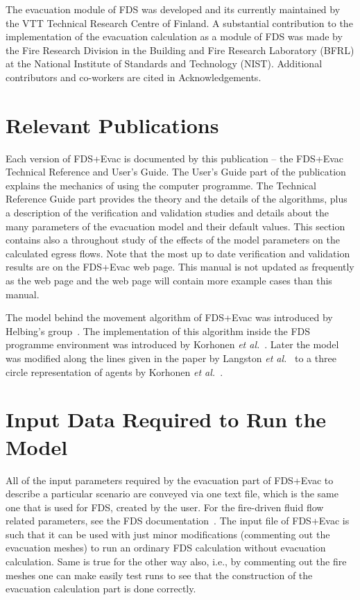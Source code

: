 \documentclass[12pt,a4paper,final,twoside]{stylevk}
\begin{document}
\noindent The evacuation module of FDS was developed and its currently
maintained by the VTT Technical Research Centre of Finland.  A
substantial contribution to the implementation of the evacuation
calculation as a module of FDS was made by the Fire Research Division
in the Building and Fire Research Laboratory (BFRL) at the National
Institute of Standards and Technology (NIST).  Additional contributors
and co-workers are cited in Acknowledgements.


\section{Relevant Publications}

\noindent Each version of FDS+Evac is documented by this publication
-- the FDS+Evac Technical Reference and User's Guide.  The User's
Guide part of the publication explains the mechanics of using the
computer programme.  The Technical Reference Guide part provides the
theory and the details of the algorithms, plus a description of the
verification and validation studies and details about the many
parameters of the evacuation model and their default values.  This
section contains also a throughout study of the effects of the model
parameters on the calculated egress flows.  Note that the most up to
date verification and validation results are on the FDS+Evac web page.
This manual is not updated as frequently as the web page and the web
page will contain more example cases than this manual.


The model behind the movement algorithm of FDS+Evac was introduced by
Helbing's group~\cite{Helbing95,Helbing00,Helbing02,Werner03}.  The
implementation of this algorithm inside the FDS programme environment
was introduced by Korhonen \emph{et al.}~\cite{Korhonen05}.  Later the
model was modified along the lines given in the paper by Langston
\emph{et al.}~\cite{Langston06} to a three circle representation of
agents by Korhonen \emph{et al.}~\cite{Korhonen07a, Korhonen07b,
  Korhonen08a, Korhonen08b}.


\section{Input Data Required to Run the Model}

\noindent All of the input parameters required by the evacuation part
of FDS+Evac to describe a particular scenario are conveyed via one
text file, which is the same one that is used for FDS, created by the
user.  For the fire-driven fluid flow related parameters, see the FDS
documentation~\cite{FDS_UserGuide}.  The input file of FDS+Evac is
such that it can be used with just minor modifications (commenting out
the evacuation meshes) to run an ordinary FDS calculation without
evacuation calculation.  Same is true for the other way also,
i.e., by commenting out the fire meshes one can make easily
test runs to see that the construction of the evacuation calculation
part is done correctly.
\end{document}
